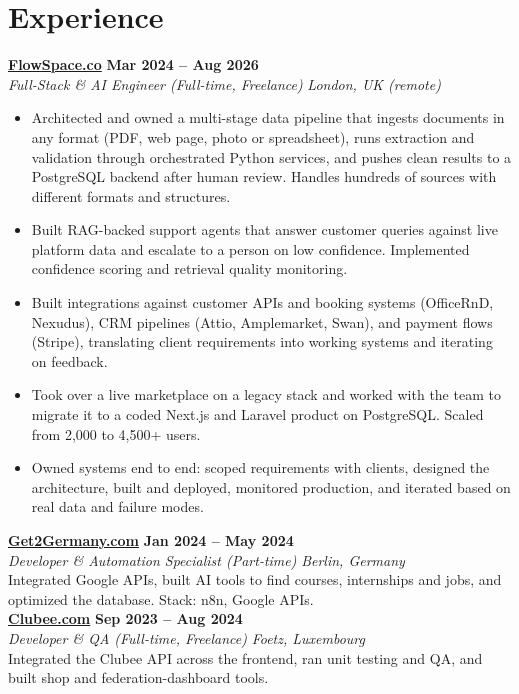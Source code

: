 \documentclass[a4paper,10pt]{article}
\newcommand{\role}[4]{%
 \textbf{#1} \hfill \textbf{#2}\\[1pt]%
 \textit{#3} \hfill \textit{#4}\\[2pt]%
}
\begin{document}
\section{Experience}

\role{\href{https://flowspace.co}{FlowSpace.co}}{Mar 2024 -- Aug 2026}{Full-Stack \& AI Engineer (Full-time, Freelance)}{London, UK (remote)}
\begin{itemize}
 \item Architected and owned a multi-stage data pipeline that ingests documents in any format (PDF, web page, photo or spreadsheet), runs extraction and validation through orchestrated Python services, and pushes clean results to a PostgreSQL backend after human review. Handles hundreds of sources with different formats and structures.
 \item Built RAG-backed support agents that answer customer queries against live platform data and escalate to a person on low confidence. Implemented confidence scoring and retrieval quality monitoring.
 \item Built integrations against customer APIs and booking systems (OfficeRnD, Nexudus), CRM pipelines (Attio, Amplemarket, Swan), and payment flows (Stripe), translating client requirements into working systems and iterating on feedback.
 \item Took over a live marketplace on a legacy stack and worked with the team to migrate it to a coded Next.js and Laravel product on PostgreSQL. Scaled from 2,000 to 4,500+ users.
 \item Owned systems end to end: scoped requirements with clients, designed the architecture, built and deployed, monitored production, and iterated based on real data and failure modes.
\end{itemize}

\role{\href{https://get2germany.com}{Get2Germany.com}}{Jan 2024 -- May 2024}{Developer \& Automation Specialist (Part-time)}{Berlin, Germany}
Integrated Google APIs, built AI tools to find courses, internships and jobs, and optimized the database. Stack: n8n, Google APIs.\\[1pt]

\role{\href{https://clubee.com}{Clubee.com}}{Sep 2023 -- Aug 2024}{Developer \& QA (Full-time, Freelance)}{Foetz, Luxembourg}
Integrated the Clubee API across the frontend, ran unit testing and QA, and built shop and federation-dashboard tools.\\[1pt]
\end{document}
